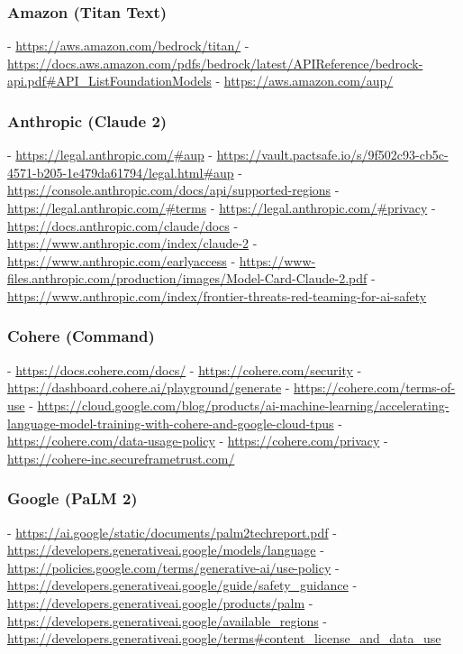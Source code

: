 \documentclass[screen, authorversion, acmsmall]{acmart}
\begin{document}
\subsubsection{Amazon (Titan Text)}
-  \url{https://aws.amazon.com/bedrock/titan/}
-  \url{https://docs.aws.amazon.com/pdfs/bedrock/latest/APIReference/bedrock-api.pdf#API_ListFoundationModels}
-  \url{https://aws.amazon.com/aup/}

\subsubsection{Anthropic (Claude 2)}
-  \url{https://legal.anthropic.com/#aup}
-  \url{https://vault.pactsafe.io/s/9f502c93-cb5c-4571-b205-1e479da61794/legal.html#aup}
-  \url{https://console.anthropic.com/docs/api/supported-regions}
-  \url{https://legal.anthropic.com/#terms}
-  \url{https://legal.anthropic.com/#privacy}
-  \url{https://docs.anthropic.com/claude/docs}
-  \url{https://www.anthropic.com/index/claude-2}
-  \url{https://www.anthropic.com/earlyaccess}
-  \url{https://www-files.anthropic.com/production/images/Model-Card-Claude-2.pdf}
-  \url{https://www.anthropic.com/index/frontier-threats-red-teaming-for-ai-safety}

\clearpage

\subsubsection{Cohere (Command)}
-  \url{https://docs.cohere.com/docs/}
-  \url{https://cohere.com/security}
-  \url{https://dashboard.cohere.ai/playground/generate}
-  \url{https://cohere.com/terms-of-use}
-  \url{https://cloud.google.com/blog/products/ai-machine-learning/accelerating-language-model-training-with-cohere-and-google-cloud-tpus}
-  \url{https://cohere.com/data-usage-policy}
-  \url{https://cohere.com/privacy}
-  \url{https://cohere-inc.secureframetrust.com/}

\subsubsection{Google (PaLM 2)}
-  \url{https://ai.google/static/documents/palm2techreport.pdf}
-  \url{https://developers.generativeai.google/models/language}
-  \url{https://policies.google.com/terms/generative-ai/use-policy}
-  \url{https://developers.generativeai.google/guide/safety_guidance}
-  \url{https://developers.generativeai.google/products/palm}
-  \url{https://developers.generativeai.google/available_regions}
-  \url{https://developers.generativeai.google/terms#content_license_and_data_use}
\end{document}
